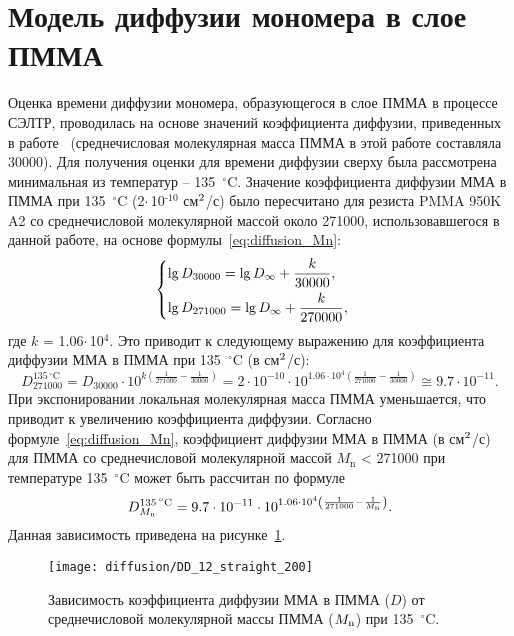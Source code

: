 \section{Модель диффузии мономера в слое ПММА}

Оценка времени диффузии мономера, образующегося в слое ПММА в процессе СЭЛТР, проводилась на основе значений коэффициента диффузии, приведенных в работе~\cite{Karlsson2001_diffusion} (среднечисловая молекулярная масса ПММА в этой работе составляла 30000). Для получения оценки для времени диффузии сверху была рассмотрена минимальная из температур -- 135~$^\circ$C.
Значение коэффициента диффузии ММА в ПММА при 135~$^\circ$C (2\:$\cdot$\,10$^\text{-10}$ см$^\text{2}$/с) было пересчитано для резиста PMMA 950K A2 со среднечисловой молекулярной массой около 271000, использовавшегося в данной работе, на основе формулы~\ref{eq:diffusion_Mn}:
\begin{equation}
	\begin{cases}
		\lg D_{30000} = \lg D_{\infty} + \displaystyle{\frac{k}{30000}}, \vspace{0.4em} \\
		\lg D_{271000} = \lg D_{\infty} + \displaystyle{\frac{k}{270000}},
	\end{cases}
\end{equation}
где $k$ = 1.06\:$\cdot$\,10$^\text{4}$. Это приводит к следующему выражению для коэффициента диффузии ММА в ПММА при 135~$^\circ$C (в см$^\text{2}$/с):
\begin{equation}
	D_{271000}^{135 \, ^\circ \mathrm{C}} = D_{30000} \cdot 10^{k \left(\frac{1}{271000} - \frac{1}{30000} \right)} = 2 \cdot 10^{-10} \cdot 10^{1.06 \cdot 10^4 \left(\frac{1}{271000} - \frac{1}{30000} \right)} \cong 9.7 \cdot 10^{-11}.
\end{equation}
При экспонировании локальная молекулярная масса ПММА уменьшается, что приводит к увеличению коэффициента диффузии. Согласно формуле~\ref{eq:diffusion_Mn}, коэффициент диффузии ММА в ПММА (в см$^\text{2}$/с) для ПММА со среднечисловой молекулярной массой $M_\mathrm{n}$ < 271000 при температуре 135~$^\circ$C может быть рассчитан по формуле
\begin{equation} \label{eq:D_Mn}
	D_{M_\mathrm{n}}^{135 \, ^\circ \mathrm{C}} = 9.7 \cdot 10^{-11} \cdot 10^{1.06 \cdot 10^4 \left( \frac{1}{271000} - \frac{1}{M_\mathrm{n}} \right)}.
\end{equation}
Данная зависимость приведена на рисунке~\ref{fig:Mn_diff}.

\begin{figure}[h]
	\begin{center}
		\texttt{[image: diffusion/DD\_12\_straight\_200]}
	\end{center}
	\vspace{-1em}
	\caption{Зависимость коэффициента диффузии ММА в ПММА ($D$) от среднечисловой молекулярной массы ПММА ($M_\mathrm{n}$) при 135~$^\circ$C.}
	\label{fig:Mn_diff}
\end{figure}

